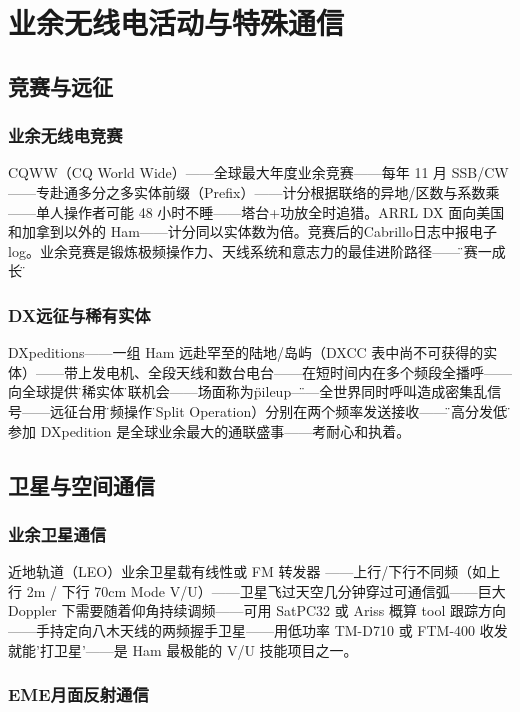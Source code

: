 \documentclass[12pt,UTF8]{ctexbook}
\begin{document}
\chapter{业余无线电活动与特殊通信}
\label{chap:ham_activities}

\section{竞赛与远征}
\label{sec:ham_contest_dx}

\subsection{业余无线电竞赛}

CQWW（CQ World Wide）——全球最大年度业余竞赛——每年 11 月 SSB/CW ——专赴通多分之多实体前缀（Prefix）——计分根据联络的异地/区数与系数乘——单人操作者可能 48 小时不睡——塔台+功放全时追猎。ARRL DX 面向美国和加拿到以外的 Ham——计分同以实体数为倍。竞赛后的Cabrillo日志中报电子 log。业余竞赛是锻炼极频操作力、天线系统和意志力的最佳进阶路径——\"一赛一成长\"。

\subsection{DX远征与稀有实体}

DXpeditions——一组 Ham 远赴罕至的陆地/岛屿（DXCC 表中尚不可获得的实体）——带上发电机、全段天线和数台电台——在短时间内在多个频段全播呼——向全球提供\"珍稀实体\"通联机会——场面称为\"pileup\"——全世界同时呼叫造成密集乱信号——远征台用\"分频操作\"（Split Operation）分别在两个频率发送接收——\"听高分发低\"。参加 DXpedition 是全球业余最大的通联盛事——考耐心和执着。

\section{卫星与空间通信}
\label{sec:ham_satellite}

\subsection{业余卫星通信}

近地轨道（LEO）业余卫星载有线性或 FM 转发器 ——上行/下行不同频（如上行 2m / 下行 70cm Mode V/U）——卫星飞过天空几分钟穿过可通信弧——巨大 Doppler 下需要随着仰角持续调频——可用 SatPC32 或 Ariss 概算 tool 跟踪方向——手持定向八木天线的两频握手卫星——用低功率 TM-D710 或 FTM-400 收发就能'打卫星'——是 Ham 最极能的 V/U 技能项目之一。

\subsection{EME月面反射通信}
\end{document}

